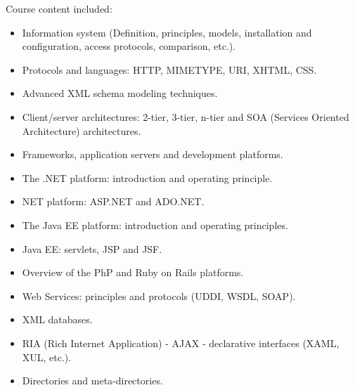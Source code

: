 Course content included:
\begin{itemize}
    \item Information system (Definition, principles, models, installation and configuration, access protocols, comparison, etc.).
    \item Protocols and languages: HTTP, MIMETYPE, URI, XHTML, CSS.
    \item Advanced XML schema modeling techniques.
    \item Client/server architectures: 2-tier, 3-tier, n-tier and SOA (Services Oriented Architecture) architectures.
    \item Frameworks, application servers and development platforms.
    \item The .NET platform: introduction and operating principle.
    \item NET platform: ASP.NET and ADO.NET.
    \item The Java EE platform: introduction and operating principles.
    \item Java EE: servlets, JSP and JSF.
    \item Overview of the PhP and Ruby on Rails platforms.
    \item Web Services: principles and protocols (UDDI, WSDL, SOAP).
    \item XML databases.
    \item RIA (Rich Internet Application) - AJAX - declarative interfaces (XAML, XUL, etc.).
    \item Directories and meta-directories.
\end{itemize}